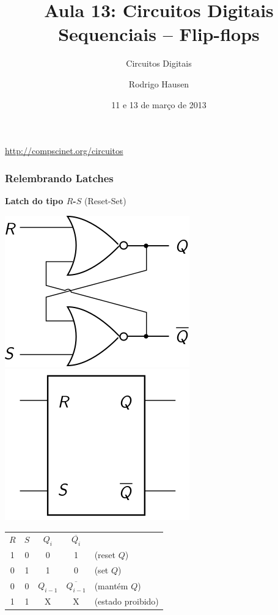 \documentclass{beamer}
\title{Aula 13: Circuitos Digitais Sequenciais -- Flip-flops}
\subtitle{Circuitos Digitais}
\author{Rodrigo Hausen}
\institute{CMCC -- UFABC}
\date{11 e 13 de março de 2013}
\newcommand{\Not}[1]{\overline{#1}}
\begin{document}
\begin{frame}
\maketitle

\vspace{-1cm}

\begin{center}
\url{http://compscinet.org/circuitos}
\end{center}

\end{frame}

\begin{frame}
\frametitle{Relembrando Latches}

\textbf{Latch do tipo $R$-$S$} (Reset-Set)

\begin{center}
\includegraphics{images/latchRS_circuit}
\hspace{6ex}
\raisebox{40pt}{\Huge$=$}
\hspace{6ex}
\includegraphics{images/latchRS_blackbox}\\

\vspace{12pt}


\begin{tabular}{cc||ccl}
$R$ & $S$ & $Q_i$ & $\Not{Q_i}$ \\
\cline{1-4}
 1  &  0  &   0   &     1       & (reset $Q$) \\
 0  &  1  &   1   &     0       & (set $Q$) \\
 0  &  0  & $Q_{i-1}$ & $\Not{Q_{i-1}}$ & (mantém $Q$) \\
 1  &  1  &   X   &     X       & (estado proibido)
\end{tabular}
\end{center}
\end{frame}
\end{document}
